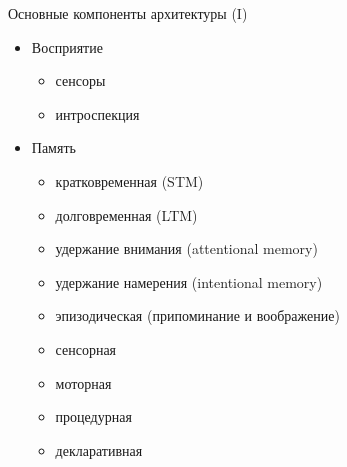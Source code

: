 \documentclass{beamer}
\begin{document}
\begin{frame}{Основные компоненты архитектуры (I)}
\begin{itemize}
	\item Восприятие
	    \medskip
	    \begin{itemize}
	        \item сенсоры
	        \item интроспекция
	    \end{itemize}
	\medskip
	\item Память
	    \medskip
	    \begin{itemize}
	        \item кратковременная (STM)
	        \item долговременная (LTM)
	        \item удержание внимания (attentional memory)
	        \item удержание намерения (intentional memory)
	        \item эпизодическая (припоминание и воображение)
	        \item сенсорная
	        \item моторная
	        \item процедурная 
	        \item декларативная 
	    \end{itemize}
\end{itemize}
\end{frame}
\end{document}

